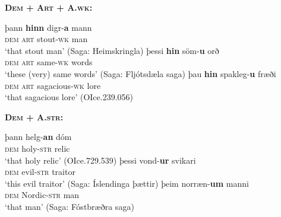 \documentclass[output=paper,colorlinks,citecolor=brown]{langscibook}
\begin{document}
\begin{exe}
\ex \label{dem} \textbf{\textsc{Dem + Art + A.wk:}} %
    \begin{xlist}
         \ex\gll þann  \textbf{hinn} digr-\textbf{a} mann  \\  
         \textsc{dem} \textsc{art} stout-\textsc{wk} man  \\ 
         \glt `that stout man' (Saga: Heimskringla)
         \ex\gll  þessi \textbf{hin} söm-\textbf{u} orð \\ 
         \textsc{dem} \textsc{art} same-\textsc{wk} words  \\ 
         \glt `these (very) same words' (Saga: Fljótsdæla saga)
         \ex\gll  þau \textbf{hin} spakleg-\textbf{u} fræði \\
         \textsc{dem} \textsc{art} sagacious-\textsc{wk} lore \\
         \glt `that sagacious lore' (OIce.239.056)
    \end{xlist}
    \ex \label{demB} \textbf{\textsc{Dem +  A.str:}}
    \begin{xlist} 
         \ex\gll þann helg-\textbf{an} dóm \\ 
         \textsc{dem} holy-\textsc{str} relic  \\ 
         \glt `that holy relic' (OIce.729.539)
         \ex\gll  þessi vond-\textbf{ur} svikari   \\ 
         \textsc{dem} evil-\textsc{str} traitor  \\ 
         \glt `this evil traitor' (Saga: Íslendinga þættir)
         \ex\gll þeim norræn-\textbf{um} manni   \\ 
         \textsc{dem} Nordic-\textsc{str} man   \\ 
         \glt `that  man' (Saga: Fóstbræðra saga)
     \end{xlist} 
\end{exe}

\end{document}

